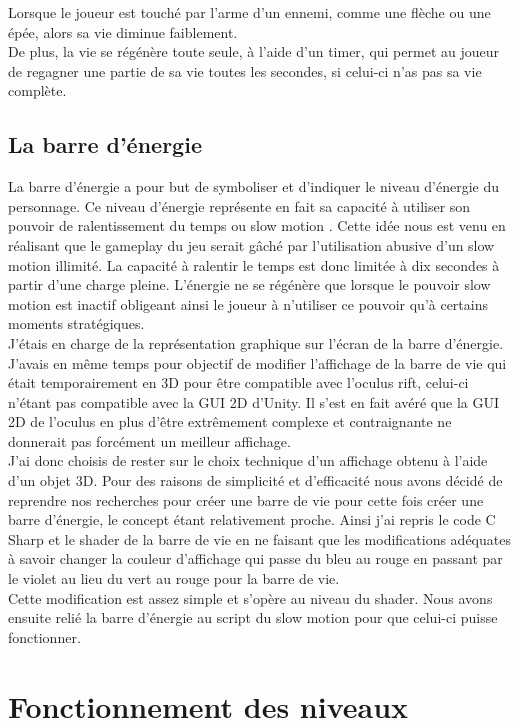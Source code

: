 \documentclass[12pt]{article}
\begin{document}
Lorsque le joueur est touché par l'arme d'un ennemi, comme une flèche ou une épée, alors sa vie diminue faiblement.\\
De plus, la vie se régénère toute seule, à l'aide d'un timer, qui permet au joueur de regagner une partie de sa vie toutes les secondes, si celui-ci n'as pas sa vie complète.

\subsection{La barre d'énergie}


La barre d’énergie a pour but de symboliser et d’indiquer le niveau d’énergie du personnage. Ce niveau d’énergie représente en fait sa capacité à utiliser son pouvoir de ralentissement du temps ou  slow motion . Cette idée nous est venu en réalisant que le gameplay du jeu serait gâché par l’utilisation abusive d’un slow motion illimité. La capacité à ralentir le temps est donc limitée à dix secondes à partir d’une charge pleine. L’énergie ne se régénère que lorsque le pouvoir slow motion est inactif obligeant ainsi le joueur à n’utiliser ce pouvoir qu’à certains moments stratégiques.\\

J’étais en charge de la représentation graphique sur l’écran de la barre d’énergie. J’avais en même temps pour objectif de modifier l’affichage de la barre de vie qui était temporairement en 3D pour être compatible avec l’oculus rift, celui-ci n’étant pas compatible avec la \gls{GUI} 2D d’Unity. Il s’est en fait avéré que la GUI 2D de l’oculus en plus d’être extrêmement complexe et contraignante ne donnerait pas forcément un meilleur affichage.\\
J’ai donc choisis de rester sur le choix technique d’un affichage obtenu à l’aide d’un objet 3D. Pour des raisons de simplicité et d’efficacité nous avons décidé de reprendre nos recherches pour créer une barre de vie pour cette fois créer une barre d’énergie, le concept étant relativement proche. Ainsi j’ai repris le code C Sharp et le shader de la barre de vie en ne faisant que les modifications adéquates à savoir changer la couleur d’affichage qui passe du bleu au rouge en passant par le violet au lieu du vert au rouge pour la barre de vie.\\
Cette modification est assez simple et s’opère au niveau du shader. Nous avons ensuite relié la barre d'énergie au script du slow motion pour que celui-ci puisse fonctionner.

\section{Fonctionnement des niveaux}
\end{document}

